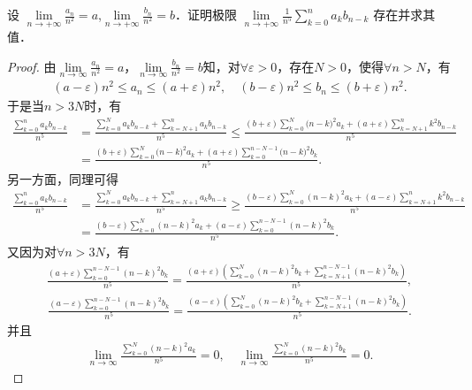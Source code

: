 \documentclass[../../main.tex]{subfiles}%
\begin{document}
\begin{example}
设 $\lim\limits_{n\rightarrow +\infty}\frac{a_n}{n^2}=a$,$\lim\limits_{n\rightarrow +\infty}\frac{b_n}{n^2}=b$．证明极限 $\lim\limits_{n\rightarrow +\infty}\frac{1}{n^5}\sum\limits_{k=0}^n a_k b_{n-k}$ 存在并求其值．
\end{example}
\begin{proof}

由$\lim\limits_{n\rightarrow \infty}\frac{a_n}{n^2}=a$，$\lim\limits_{n\rightarrow \infty}\frac{b_n}{n^2}=b$知，对$\forall \varepsilon >0$，存在$N>0$，使得$\forall n>N$，有
\begin{align*}
(a-\varepsilon) n^2\leqslant a_n\leqslant (a+\varepsilon) n^2,\quad (b-\varepsilon) n^2\leqslant b_n\leqslant (b+\varepsilon) n^2.
\end{align*}
于是当$n>3N$时，有
\begin{align*}
\frac{\sum\limits_{k=0}^n{a_kb_{n-k}}}{n^5}&=\frac{\sum\limits_{k=0}^N{a_kb_{n-k}}+\sum\limits_{k=N+1}^n{a_kb_{n-k}}}{n^5}\leqslant \frac{(b+\varepsilon )\sum\limits_{k=0}^N{(n}-k)^2a_k+(a+\varepsilon )\sum\limits_{k=N+1}^n{k^2b_{n-k}}}{n^5}
\\
&=\frac{(b+\varepsilon )\sum\limits_{k=0}^N{(n}-k)^2a_k+(a+\varepsilon )\sum\limits_{k=0}^{n-N-1}{(n}-k)^2b_k}{n^5}.
\end{align*}
另一方面，同理可得
\begin{align*}
\frac{\sum\limits_{k=0}^n a_kb_{n-k}}{n^5}&=\frac{\sum\limits_{k=0}^N a_kb_{n-k}+\sum\limits_{k=N+1}^n a_kb_{n-k}}{n^5}\geqslant \frac{(b-\varepsilon) \sum\limits_{k=0}^N (n-k)^2a_k+(a-\varepsilon) \sum\limits_{k=N+1}^n k^2b_{n-k}}{n^5}
\\
&=\frac{(b-\varepsilon) \sum\limits_{k=0}^N (n-k)^2a_k+(a-\varepsilon) \sum\limits_{k=0}^{n-N-1} (n-k)^2b_k}{n^5}.
\end{align*}
又因为对$\forall n>3N$，有
\begin{align*}
\frac{(a+\varepsilon) \sum\limits_{k=0}^{n-N-1} (n-k)^2b_k}{n^5}=\frac{(a+\varepsilon) \left( \sum\limits_{k=0}^N (n-k)^2b_k+\sum\limits_{k=N+1}^{n-N-1} (n-k)^2b_k \right)}{n^5},
\end{align*}
\begin{align*}
\frac{(a-\varepsilon) \sum\limits_{k=0}^{n-N-1} (n-k)^2b_k}{n^5}=\frac{(a-\varepsilon) \left( \sum\limits_{k=0}^N (n-k)^2b_k+\sum\limits_{k=N+1}^{n-N-1} (n-k)^2b_k \right)}{n^5}.
\end{align*}
并且
\begin{align*}
\lim\limits_{n\rightarrow \infty}\frac{\sum\limits_{k=0}^N (n-k)^2a_k}{n^5}=0,\quad \lim\limits_{n\rightarrow \infty}\frac{\sum\limits_{k=0}^N (n-k)^2b_k}{n^5}=0.

\end{align*}
\end{proof}
\end{document}
